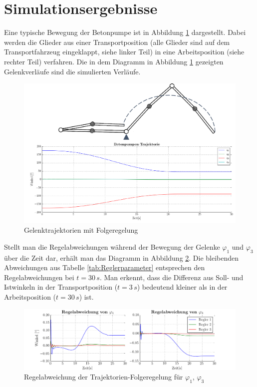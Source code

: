 \section{Simulationsergebnisse}
Eine typische Bewegung der Betonpumpe ist in Abbildung \ref{fig:Verlauf_Trajektorienfolgeregelung} dargestellt. Dabei werden die Glieder aus einer Transportposition (alle Glieder sind auf dem Transportfahrzeug eingeklappt, siehe linker Teil) in eine Arbeitsposition (siehe rechter Teil) verfahren. Die in dem Diagramm in Abbildung \ref{fig:Verlauf_Trajektorienfolgeregelung} gezeigten Gelenkverläufe sind die simulierten Verläufe. 
	\begin{figure}[h!]
		\centering
		\includegraphics[scale=0.7]{Bilder/Verlauf_Trajektorienfolgeregelung.pdf}
		\caption{Gelenktrajektorien mit Folgeregelung}
		\label{fig:Verlauf_Trajektorienfolgeregelung}
	\end{figure}\newline
Stellt man die Regelabweichungen während der Bewegung der Gelenke $\varphi_1$  und $\varphi_3$ über die Zeit dar, erhält man das Diagramm in Abbildung \ref{fig:Regelabweichung_Folgeregelung}. Die bleibenden Abweichungen aus Tabelle \ref{tab:Reglerparameter} entsprechen den Regelabweichungen bei $t=30\,\si{s}$. Man erkennt, dass die Differenz aus Soll- und Istwinkeln in der Transportposition ($t=3\,\si{s}$) bedeutend kleiner als in der Arbeitsposition ($t=30\,\si{s}$) ist.
\newline 
	\begin{figure}[h!]
		\centering
		\includegraphics[scale=0.55]{Bilder/Regelabweichung_Folgeregelung.png}
		\caption{Regelabweichung der Trajektorien-Folgeregelung für $\varphi_1$, $\varphi_3$}
		\label{fig:Regelabweichung_Folgeregelung}
	\end{figure}\newline
	
